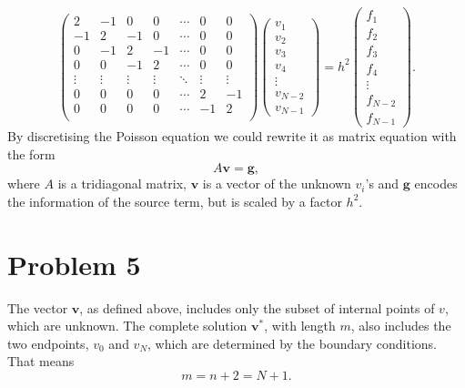 \documentclass[english,notitlepage,aps,pra,10pt]{revtex4-1}  %
\newcommand{\bv}[1]{\mathbf{#1}}
\begin{document}
\begin{equation}
    \begin{pmatrix}
         2 & -1 &  0 &  0 & \cdots &  0 &  0 \\
        -1 &  2 & -1 &  0 & \cdots &  0 &  0 \\
         0 & -1 &  2 & -1 & \cdots &  0 &  0 \\
         0 &  0 & -1 &  2 & \cdots &  0 &  0 \\
        \vdots & \vdots & \vdots & \vdots & \ddots & \vdots  & \vdots\\
         0 &  0 &  0 &  0 & \cdots &  2 & -1 \\
         0 &  0 &  0 &  0 & \cdots & -1 &  2 \\
    \end{pmatrix}
    \begin{pmatrix}
        v_1 \\
        v_2 \\
        v_3 \\
        v_4 \\
        \vdots \\
        v_{N-2} \\
        v_{N-1}
    \end{pmatrix}
    =
    h^2
    \begin{pmatrix}
        f_1 \\
        f_2 \\
        f_3 \\
        f_4 \\
        \vdots \\
        f_{N-2} \\
        f_{N-1}
    \end{pmatrix}.
\end{equation}
By discretising the Poisson equation we could rewrite it as matrix equation with the form 
\begin{equation}
    A \bv{v} = \bv{g},
\end{equation}
where $A$ is a tridiagonal matrix, $\bv{v}$ is a vector of the unknown $v_i$'s and $\bv{g}$ encodes the information of the source term, but is scaled by a factor $h^2$. 


\section*{Problem 5}

The vector $\bv{v}$, as defined above, includes only the subset of internal points of $v$, which are unknown. The complete solution $\bv{v}^*$, with length $m$, also includes the two endpoints, $v_0$ and $v_N$, which are determined by the boundary conditions. That means
\begin{equation}
    m = n + 2 = N + 1.
\end{equation}
\end{document}
